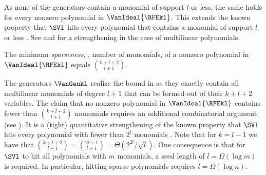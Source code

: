 \documentclass{toc}
\begin{document}
As none of the generators contain a monomial of support $l$ or less, the same holds for every nonzero polynomial in $\VanIdeal{\RFEkl}$.
This extends the known property that $\SVl$ hits every polynomial that contains a monomial of support $l$ or less \cite{ShpilkaVolkovich2008}. 
See  and  for a strengthening in the case of multilinear polynomials. 

\begin{corollary}
    \label{cor.rfe.sparseness}
    The minimum {\em sparseness}, \ie, number of monomials, of a nonzero
    polynomial in $\VanIdeal{\RFEkl}$ equals $\binom{k+l+2}{l+1}$.
\end{corollary}
The generators $\VanGenkl$ realize the bound in  as they exactly contain all
multilinear monomials of degree $l+1$ that can be formed out of their
$k+l+2$ variables.
The claim that no nonzero polynomial in $\VanIdeal{\RFEkl}$ contains fewer
than $\binom{k+l+2}{l+1}$ monomials requires an additional combinatorial
argument (see ). 
It is a (tight) quantitative strengthening of the known property that
$\SVl$ hits every polynomial with fewer than $2^l$ monomials
\cite{AvMV2011,GKST2015,Forbes2015,FSV2018}.
Note that for $k=l-1$ we have that
$\binom{k+l+2}{l+1} = \binom{2l+1}{l+1} = \Theta(2^{2l}/\sqrt{l})$.
One consequence is that for $\SVl$ to hit all polynomials with $m$ monomials, a seed length of $l=\Omega(\log m)$ is required. In particular, hitting sparse polynomials requires $l = \Omega(\log n)$. 
\end{document}
